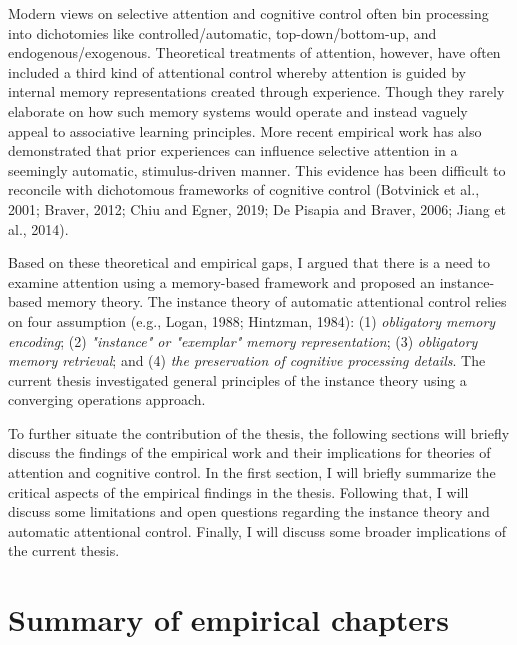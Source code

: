 \documentclass[]{DissertateCUNY}
\begin{document}
Modern views on selective attention and cognitive control often bin
processing into dichotomies like controlled/automatic,
top-down/bottom-up, and endogenous/exogenous. Theoretical treatments of
attention, however, have often included a third kind of attentional
control whereby attention is guided by internal memory representations
created through experience. Though they rarely elaborate on how such
memory systems would operate and instead vaguely appeal to associative
learning principles. More recent empirical work has also demonstrated
that prior experiences can influence selective attention in a seemingly
automatic, stimulus-driven manner. This evidence has been difficult to
reconcile with dichotomous frameworks of cognitive control (Botvinick et
al., 2001; Braver, 2012; Chiu and Egner, 2019; De Pisapia and Braver,
2006; Jiang et al., 2014).

Based on these theoretical and empirical gaps, I argued that there is a
need to examine attention using a memory-based framework and proposed an
instance-based memory theory. The instance theory of automatic
attentional control relies on four assumption (e.g., Logan, 1988;
Hintzman, 1984): (1) \textit{obligatory memory encoding}; (2)
\textit{"instance" or "exemplar" memory representation}; (3)
\textit{obligatory memory retrieval}; and (4)
\textit{the preservation of cognitive processing details}. The current
thesis investigated general principles of the instance theory using a
converging operations approach.

To further situate the contribution of the thesis, the following
sections will briefly discuss the findings of the empirical work and
their implications for theories of attention and cognitive control. In
the first section, I will briefly summarize the critical aspects of the
empirical findings in the thesis. Following that, I will discuss some
limitations and open questions regarding the instance theory and
automatic attentional control. Finally, I will discuss some broader
implications of the current thesis.

\hypertarget{summary-of-empirical-chapters}{%
\section{Summary of empirical
chapters}\label{summary-of-empirical-chapters}}
\end{document}
